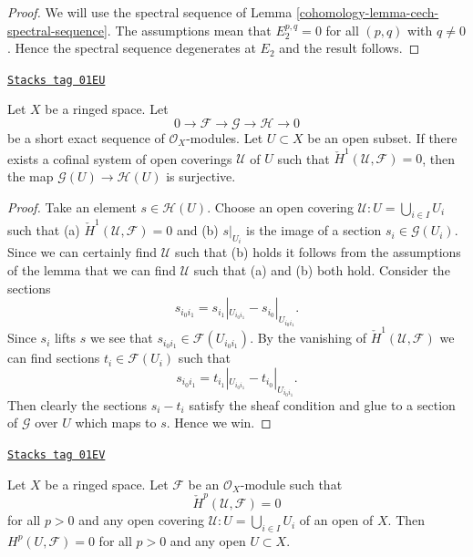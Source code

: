 \begin{proof}

We will use the spectral sequence of
Lemma \ref{cohomology-lemma-cech-spectral-sequence}.
The assumptions mean that $E_2^{p, q} = 0$ for all $(p, q)$ with
$q \not = 0$. Hence the spectral sequence degenerates at $E_2$
and the result follows.
\end{proof}

\begin{lemma}
\label{cohomology-lemma-ses-cech-h1}
\href{https://stacks.math.columbia.edu/tag/01EU}{\texttt{Stacks tag 01EU}}

Let $X$ be a ringed space.
Let
$$
0 \to \mathcal{F} \to \mathcal{G} \to \mathcal{H} \to 0
$$
be a short exact sequence of $\mathcal{O}_X$-modules.
Let $U \subset X$ be an open subset.
If there exists a cofinal system of open coverings $\mathcal{U}$
of $U$ such that $\check{H}^1(\mathcal{U}, \mathcal{F}) = 0$,
then the map $\mathcal{G}(U) \to \mathcal{H}(U)$ is
surjective.
\end{lemma}

\begin{proof}
Take an element $s \in \mathcal{H}(U)$. Choose an open covering
$\mathcal{U} : U = \bigcup_{i \in I} U_i$ such that
(a) $\check{H}^1(\mathcal{U}, \mathcal{F}) = 0$ and (b)
$s|_{U_i}$ is the image of a section $s_i \in \mathcal{G}(U_i)$.
Since we can certainly find $\mathcal{U}$ such that (b) holds
it follows from the assumptions of the lemma that we can find
$\mathcal{U}$ such that (a) and (b) both hold.
Consider the sections
$$
s_{i_0i_1} = s_{i_1}|_{U_{i_0i_1}} - s_{i_0}|_{U_{i_0i_1}}.
$$
Since $s_i$ lifts $s$ we see that $s_{i_0i_1} \in \mathcal{F}(U_{i_0i_1})$.
By the vanishing of $\check{H}^1(\mathcal{U}, \mathcal{F})$ we can
find sections $t_i \in \mathcal{F}(U_i)$ such that
$$
s_{i_0i_1} = t_{i_1}|_{U_{i_0i_1}} - t_{i_0}|_{U_{i_0i_1}}.
$$
Then clearly the sections $s_i - t_i$ satisfy the sheaf condition
and glue to a section of $\mathcal{G}$ over $U$ which maps to $s$.
Hence we win.
\end{proof}

\begin{lemma}
\label{cohomology-lemma-cech-vanish}
\href{https://stacks.math.columbia.edu/tag/01EV}{\texttt{Stacks tag 01EV}}


Let $X$ be a ringed space.
Let $\mathcal{F}$ be an $\mathcal{O}_X$-module such that
$$
\check{H}^p(\mathcal{U}, \mathcal{F}) = 0
$$
for all $p > 0$ and any open covering $\mathcal{U} : U = \bigcup_{i \in I} U_i$
of an open of $X$. Then $H^p(U, \mathcal{F}) = 0$ for all $p > 0$
and any open $U \subset X$.
\end{lemma}

